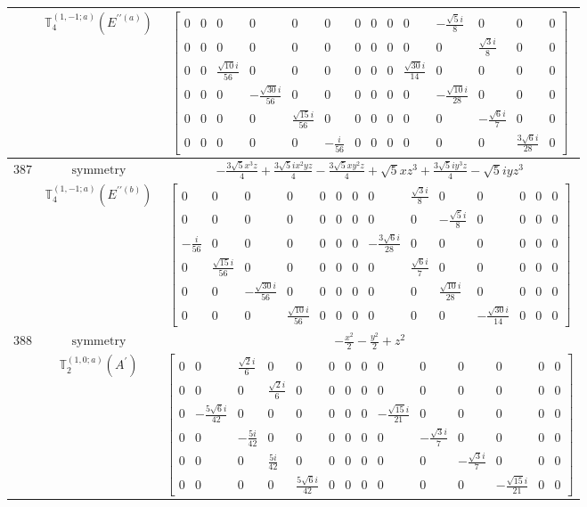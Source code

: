 \documentclass[fleqn,8pt,landscape]{jsarticle}
\begin{document}
\begin{longtable}{ccc}
$  $ & $ \mathbb{T}_{4}^{(1,-1;a)}(E^{\prime\prime(a)}) $ & $ \begin{bmatrix} 0 & 0 & 0 & 0 & 0 & 0 & 0 & 0 & 0 & 0 & - \frac{\sqrt{5} i}{8} & 0 & 0 & 0 \\ 0 & 0 & 0 & 0 & 0 & 0 & 0 & 0 & 0 & 0 & 0 & \frac{\sqrt{3} i}{8} & 0 & 0 \\ 0 & 0 & \frac{\sqrt{10} i}{56} & 0 & 0 & 0 & 0 & 0 & 0 & \frac{\sqrt{30} i}{14} & 0 & 0 & 0 & 0 \\ 0 & 0 & 0 & - \frac{\sqrt{30} i}{56} & 0 & 0 & 0 & 0 & 0 & 0 & - \frac{\sqrt{10} i}{28} & 0 & 0 & 0 \\ 0 & 0 & 0 & 0 & \frac{\sqrt{15} i}{56} & 0 & 0 & 0 & 0 & 0 & 0 & - \frac{\sqrt{6} i}{7} & 0 & 0 \\ 0 & 0 & 0 & 0 & 0 & - \frac{i}{56} & 0 & 0 & 0 & 0 & 0 & 0 & \frac{3 \sqrt{6} i}{28} & 0 \end{bmatrix} $ \\ \hline
$ 387 $ & $ \text{symmetry} $ & $ - \frac{3 \sqrt{5} x^{3} z}{4} + \frac{3 \sqrt{5} i x^{2} y z}{4} - \frac{3 \sqrt{5} x y^{2} z}{4} + \sqrt{5} x z^{3} + \frac{3 \sqrt{5} i y^{3} z}{4} - \sqrt{5} i y z^{3} $ \\
$  $ & $ \mathbb{T}_{4}^{(1,-1;a)}(E^{\prime\prime(b)}) $ & $ \begin{bmatrix} 0 & 0 & 0 & 0 & 0 & 0 & 0 & 0 & \frac{\sqrt{3} i}{8} & 0 & 0 & 0 & 0 & 0 \\ 0 & 0 & 0 & 0 & 0 & 0 & 0 & 0 & 0 & - \frac{\sqrt{5} i}{8} & 0 & 0 & 0 & 0 \\ - \frac{i}{56} & 0 & 0 & 0 & 0 & 0 & 0 & - \frac{3 \sqrt{6} i}{28} & 0 & 0 & 0 & 0 & 0 & 0 \\ 0 & \frac{\sqrt{15} i}{56} & 0 & 0 & 0 & 0 & 0 & 0 & \frac{\sqrt{6} i}{7} & 0 & 0 & 0 & 0 & 0 \\ 0 & 0 & - \frac{\sqrt{30} i}{56} & 0 & 0 & 0 & 0 & 0 & 0 & \frac{\sqrt{10} i}{28} & 0 & 0 & 0 & 0 \\ 0 & 0 & 0 & \frac{\sqrt{10} i}{56} & 0 & 0 & 0 & 0 & 0 & 0 & - \frac{\sqrt{30} i}{14} & 0 & 0 & 0 \end{bmatrix} $ \\ \hline
$ 388 $ & $ \text{symmetry} $ & $ - \frac{x^{2}}{2} - \frac{y^{2}}{2} + z^{2} $ \\
$  $ & $ \mathbb{T}_{2}^{(1,0;a)}(A^{\prime}) $ & $ \begin{bmatrix} 0 & 0 & \frac{\sqrt{2} i}{6} & 0 & 0 & 0 & 0 & 0 & 0 & 0 & 0 & 0 & 0 & 0 \\ 0 & 0 & 0 & \frac{\sqrt{2} i}{6} & 0 & 0 & 0 & 0 & 0 & 0 & 0 & 0 & 0 & 0 \\ 0 & - \frac{5 \sqrt{6} i}{42} & 0 & 0 & 0 & 0 & 0 & 0 & - \frac{\sqrt{15} i}{21} & 0 & 0 & 0 & 0 & 0 \\ 0 & 0 & - \frac{5 i}{42} & 0 & 0 & 0 & 0 & 0 & 0 & - \frac{\sqrt{3} i}{7} & 0 & 0 & 0 & 0 \\ 0 & 0 & 0 & \frac{5 i}{42} & 0 & 0 & 0 & 0 & 0 & 0 & - \frac{\sqrt{3} i}{7} & 0 & 0 & 0 \\ 0 & 0 & 0 & 0 & \frac{5 \sqrt{6} i}{42} & 0 & 0 & 0 & 0 & 0 & 0 & - \frac{\sqrt{15} i}{21} & 0 & 0 \end{bmatrix} $ \\ \hline

\end{longtable}
\end{document}
